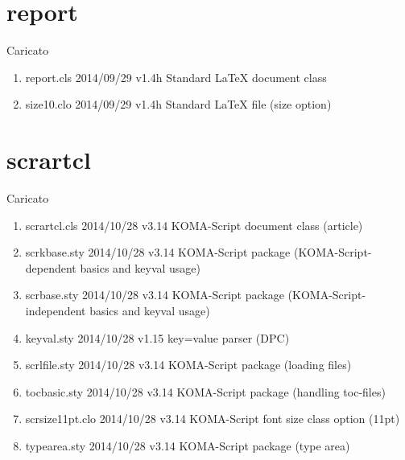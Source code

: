 \section{report}

Caricato
\begin{enumerate}
\item 		report.cls 2014/09/29 v1.4h Standard LaTeX document class
\item 	size10.clo 2014/09/29 v1.4h Standard LaTeX file (size option)
\end{enumerate}
\section{scrartcl}

Caricato
\begin{enumerate}
\item 	scrartcl.cls 2014/10/28 v3.14 KOMA-Script document class (article)
\item 	scrkbase.sty 2014/10/28 v3.14 KOMA-Script package (KOMA-Script-dependent basics and keyval usage)
\item 	scrbase.sty 2014/10/28 v3.14 KOMA-Script package (KOMA-Script-independent basics and keyval usage)
\item 	keyval.sty 2014/10/28 v1.15 key=value parser (DPC)
\item 	scrlfile.sty 2014/10/28 v3.14 KOMA-Script package (loading files)
\item 	tocbasic.sty 2014/10/28 v3.14 KOMA-Script package (handling toc-files)
\item 	scrsize11pt.clo 2014/10/28 v3.14 KOMA-Script font size class option (11pt)
\item 	typearea.sty 2014/10/28 v3.14 KOMA-Script package (type area)
\end{enumerate}

